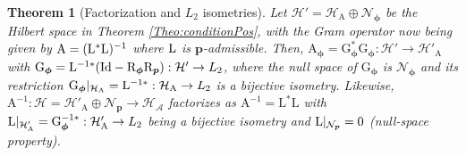 \documentclass[11pt, english,english]{article}
\newtheorem{theorem}{Theorem}
\newcommand{\Lop}{{\rm L}}
\def\V#1{{\boldsymbol{#1}}}         %
\def\Spc#1{{\mathcal{#1}}}  %
\def\Op#1{{\mathrm{#1}}}  %
\def\Identity{\mathrm{Id}} %
\renewcommand{\[}{\begin{equation}}
\renewcommand{\]}[1]{\label{eq:#1}\end{equation}}
\begin{document}
\begin{theorem}[Factorization and $L_2$ isometries]
\label{Theo:FactoRiesz}
Let $\Spc H'=\Spc H_\Op A \oplus \Spc N_{\V \phi}$
be the Hilbert space in Theorem \ref{Theo:conditionPos}, with
the Gram operator now being given by $\Op A=(\Lop^\ast\Lop)^{-1}$ where $\Lop$ is $\V p$-admissible.
Then,
$\Op A_{\V \phi}=\Op G_{\V \phi}^\ast \Op G_{\V \phi}: \Spc H' \to \Spc H'_{\Op A}$ with $\Op G_{\V \phi}=\Op \Lop^{-1\ast}(\Identity-\Op R_{\V \phi}\Op R_{\V p}): \Spc H' \to L_2$, where the null space of $\Op G_{\V \phi}$ is $\Spc N_\V \phi$ and its restriction $\Op G_{\V \phi}|_{\Spc H_\Op A}=\Lop^{-1\ast}: \Spc H_{\Op A} \to L_2$
is a  bijective isometry.
Likewise, $\Op A^{-1}: \Spc H=\Spc H'_{\Op A} \oplus \Spc N_\V p \to \Spc H_{\Spc A}$ factorizes as $\Op A^{-1}=\Op L^\ast \Op L$ with 
$\Lop|_{\Spc H'_\Op A}= \Op G_\V \phi^{-1\ast}: \Spc H'_{\Op A} \to L_2$ being a bijective isometry and
$\Lop|_{\Spc N_\V p}=0$ (null-space property).  
\end{theorem}
\end{document}
